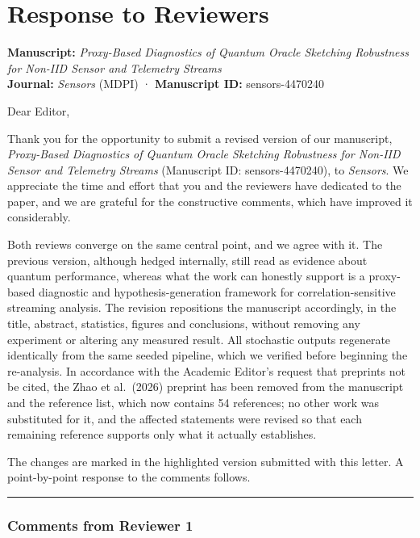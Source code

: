\documentclass[
  11pt,
]{article}
\author{}
\date{}
\begin{document}
\section{Response to Reviewers}\label{response-to-reviewers}

\textbf{Manuscript:} \emph{Proxy-Based Diagnostics of Quantum Oracle
Sketching Robustness for Non-IID Sensor and Telemetry Streams}\\
\textbf{Journal:} \emph{Sensors} (MDPI) · \textbf{Manuscript ID:}
sensors-4470240

Dear Editor,

Thank you for the opportunity to submit a revised version of our
manuscript, \emph{Proxy-Based Diagnostics of Quantum Oracle Sketching
Robustness for Non-IID Sensor and Telemetry Streams} (Manuscript ID:
sensors-4470240), to \emph{Sensors}. We appreciate the time and effort
that you and the reviewers have dedicated to the paper, and we are
grateful for the constructive comments, which have improved it
considerably.

Both reviews converge on the same central point, and we agree with it.
The previous version, although hedged internally, still read as evidence
about quantum performance, whereas what the work can honestly support is
a proxy-based diagnostic and hypothesis-generation framework for
correlation-sensitive streaming analysis. The revision repositions the
manuscript accordingly, in the title, abstract, statistics, figures and
conclusions, without removing any experiment or altering any measured
result. All stochastic outputs regenerate identically from the same
seeded pipeline, which we verified before beginning the re-analysis. In
accordance with the Academic Editor's request that preprints not be
cited, the Zhao et al.~(2026) preprint has been removed from the
manuscript and the reference list, which now contains 54 references; no
other work was substituted for it, and the affected statements were
revised so that each remaining reference supports only what it actually
establishes.

The changes are marked in the highlighted version submitted with this
letter. A point-by-point response to the comments follows.

\begin{center}\rule{0.5\linewidth}{0.5pt}\end{center}

\subsubsection{Comments from Reviewer 1}\label{comments-from-reviewer-1}
\end{document}
